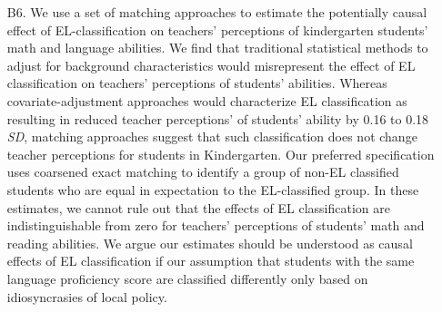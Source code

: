 \documentclass[a4paper, 11pt]{article}
\begin{document}
\begin{enumerate}
	\item[B6.] We use a set of matching approaches to estimate the potentially causal effect of EL-classification on teachers' perceptions of kindergarten students' math and language abilities. We find that traditional statistical methods to adjust for background characteristics would misrepresent the effect of EL classification on teachers' perceptions of students' abilities. Whereas covariate-adjustment approaches would characterize EL classification as resulting in reduced teacher perceptions' of students' ability by 0.16 to 0.18 \textit{SD}, matching approaches suggest that such classification does not change teacher perceptions for students in Kindergarten. Our preferred specification uses coarsened exact matching to identify a group of non-EL classified students who are equal in expectation to the EL-classified group. In these estimates, we cannot rule out that the effects of EL classification are indistinguishable from zero for teachers' perceptions of students' math and reading abilities. We argue our estimates should be understood as causal effects of EL classification if our assumption that students with the same language proficiency score are classified differently only based on idiosyncrasies of local policy. 
	
\end{enumerate}

\begin{landscape}

\end{landscape}
\end{document}
